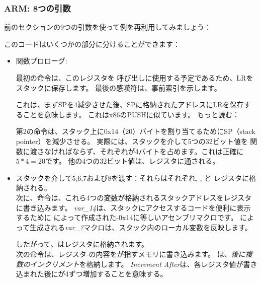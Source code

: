 \subsubsection{ARM: 8つの引数}

前のセクションの9つの引数を使って例を再利用してみましょう：



\myparagraph{\OptimizingKeilVI: \ARMMode}



このコードはいくつかの部分に分けることができます：

\begin{itemize}
\item 関数プロローグ:

最初の命令は、このレジスタを \printf 呼び出しに使用する予定であるため、\ac{LR}をスタックに保存します。 
最後の感嘆符は、事前索引を示します。

これは、まず\ac{SP}を4減少させた後、\ac{SP}に格納されたアドレスに\ac{LR}を保存することを意味します。
これはx86のPUSHに似ています。 
もっと読む：

第2の命令は、スタック上に0x14（20）バイトを割り当てるために\ac{SP}（\gls{stack pointer}）を減少させる。 
実際には、スタックを介して5つの32ビット値を \printf 関数に渡さなければならず、それぞれが4バイトを占めます。これは正確に$5*4=20$です。
他の4つの32ビット値は、レジスタに通される。

\item スタックを介して5,6,7および8を渡す：それらはそれぞれ, ,  と レジスタに格納される。\\
次に、命令は、これら4つの変数が格納されるスタックアドレスをレジスタに書き込みます。 
\emph{var\_14}は、スタックにアクセスするコードを便利に表示するために \IDA によって作成された-0x14に等しいアセンブリマクロです。 
\IDA によって生成される\emph{var\_?}マクロは、スタック内のローカル変数を反映します。

したがって、はレジスタに格納されます。\\
次の命令は、レジスタ-の内容をが指すメモリに書き込みます。 
は、\emph{後に複数のインクリメント}を格納します。 
\emph{Increment After}は、各レジスタ値が書き込まれた後にが4ずつ増加することを意味する。


\end{itemize}
